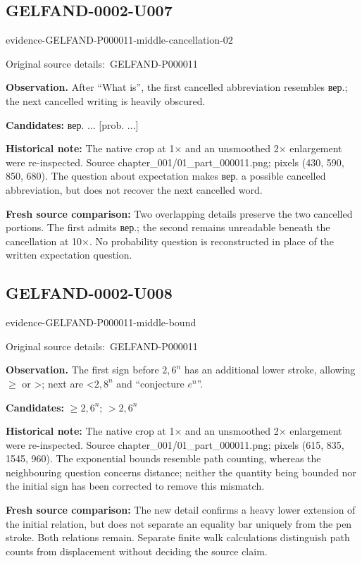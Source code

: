 \documentclass[11pt]{article}
\newcommand{\EvidenceBlock}[4]{%
 \par\smallskip\noindent\begin{minipage}{\linewidth}
 \begin{minipage}[t]{.47\linewidth}\vspace{0pt}\centering
 \csname evidence-#1-#2\endcsname\par
 {\scriptsize\SourceCropCaption\ #1}\par
 \end{minipage}\hfill
 \begin{minipage}[t]{.49\linewidth}\vspace{0pt}\raggedright
 {\small\color{orange!65!black}\textbf{#4} #3}\par
 \end{minipage}
 \end{minipage}\par\smallskip}
\newcommand{\SourceCropCaption}{Original source details:}\newcommand{\ReadingCaption}{Uncertain reading.}\newcommand{\IncompleteCaption}{Undeciphered passage.}\newcommand{\DiagramCaption}{Diagram and typed description.}
\begin{document}
\subsection*{GELFAND-0002-U007}
\EvidenceBlock{GELFAND-P000011}{middle-cancellation-02}{After “What is”, the first cancelled abbreviation resembles вер.; the next cancelled writing is heavily obscured.}{Observation.}
\par\smallskip\noindent\textbf{Candidates: } вер. ... [prob. ...]\par
\par\smallskip\noindent\textbf{Historical note: } The native crop at 1× and an unsmoothed 2× enlargement were re-inspected. Source chapter\_001/01\_part\_000011.png; pixels (430, 590, 850, 680). The question about expectation makes вер. a possible cancelled abbreviation, but does not recover the next cancelled word.\par
\par\smallskip\noindent\textbf{Fresh source comparison: } Two overlapping details preserve the two cancelled portions. The first admits вер.; the second remains unreadable beneath the cancellation at 10×. No probability question is reconstructed in place of the written expectation question.\par

\subsection*{GELFAND-0002-U008}
\EvidenceBlock{GELFAND-P000011}{middle-bound}{The first sign before \(2{,}6^n\) has an additional lower stroke, allowing \(\ge\) or >; next are <\(2{,}8^n\) and “conjecture \(e^n\)”.}{Observation.}
\par\smallskip\noindent\textbf{Candidates: } \(\geq2{,}6^n\); \(>2{,}6^n\)\par
\par\smallskip\noindent\textbf{Historical note: } The native crop at 1× and an unsmoothed 2× enlargement were re-inspected. Source chapter\_001/01\_part\_000011.png; pixels (615, 835, 1545, 960). The exponential bounds resemble path counting, whereas the neighbouring question concerns distance; neither the quantity being bounded nor the initial sign has been corrected to remove this mismatch.\par
\par\smallskip\noindent\textbf{Fresh source comparison: } The new detail confirms a heavy lower extension of the initial relation, but does not separate an equality bar uniquely from the pen stroke. Both relations remain. Separate finite walk calculations distinguish path counts from displacement without deciding the source claim.\par
\end{document}
